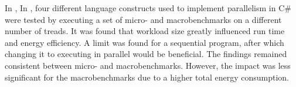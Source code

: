 In \cite{Lindholt2022}, %
In \cite{Lindholt2022}, four different language constructs used to implement parallelism in C\# were tested by executing a set of micro- and macrobenchmarks on a different number of treads. It was found that workload size greatly influenced run time and energy efficiency. A limit was found for a sequential program, after which changing it to executing in parallel would be beneficial. The findings remained consistent between micro- and macrobenchmarks. However, the impact was less significant for the macrobenchmarks due to a higher total energy consumption.%



